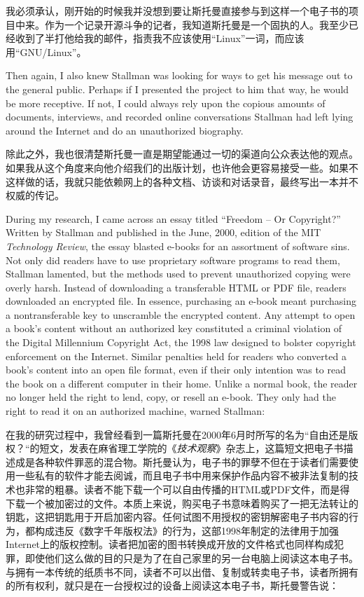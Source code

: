 \ifdefined\chs
我必须承认，刚开始的时候我并没想到要让斯托曼直接参与到这样一个电子书的项目中来。作为一个记录开源斗争的记者，我知道斯托曼是一个固执的人。我至少已经收到了半打他给我的邮件，指责我不应该使用“Linux”一词，而应该用“GNU/Linux”。
\fi

\ifdefined\eng
Then again, I also knew Stallman was looking for ways to get his message out to the general public. Perhaps if I presented the project to him that way, he would be more receptive. If not, I could always rely upon the copious amounts of documents, interviews, and recorded online conversations Stallman had left lying around the Internet and do an unauthorized biography.
\fi

\ifdefined\chs
除此之外，我也很清楚斯托曼一直是期望能通过一切的渠道向公众表达他的观点。如果我从这个角度来向他介绍我们的出版计划，也许他会更容易接受一些。如果不这样做的话，我就只能依赖网上的各种文档、访谈和对话录音，最终写出一本并不权威的传记。
\fi

\ifdefined\eng
During my research, I came across an essay titled ``Freedom -- Or Copyright?'' Written by Stallman and published in the June, 2000, edition of the MIT \textit{Technology Review}, the essay blasted e-books for an assortment of software sins. Not only did readers have to use proprietary software programs to read them, Stallman lamented, but the methods used to prevent unauthorized copying were overly harsh. Instead of downloading a transferable HTML or PDF file, readers downloaded an encrypted file. In essence, purchasing an e-book meant purchasing a nontransferable key to unscramble the encrypted content. Any attempt to open a book's content without an authorized key constituted a criminal violation of the Digital Millennium Copyright Act, the 1998 law designed to bolster copyright enforcement on the Internet. Similar penalties held for readers who converted a book's content into an open file format, even if their only intention was to read the book on a different computer in their home. Unlike a normal book, the reader no longer held the right to lend, copy, or resell an e-book. They only had the right to read it on an authorized machine, warned Stallman:
\fi

\ifdefined\chs
在我的研究过程中，我曾经看到一篇斯托曼在2000年6月时所写的名为“自由还是版权？“的短文，发表在麻省理工学院的《\textit{技术观察}》杂志上，这篇短文把电子书描述成是各种软件罪恶的混合物。斯托曼认为，电子书的罪孽不但在于读者们需要使用一些私有的软件才能去阅诚，而且电子书中用来保护作品内容不被非法复制的技术也非常的粗暴。读者不能下载一个可以自由传播的HTML或PDF文件，而是得下载一个被加密过的文件。本质上来说，购买电子书意味着购买了一把无法转让的钥匙，这把钥匙用于开启加密内容。任何试图不用授权的密钥解密电子书内容的行为，都构成违反《数字千年版权法》的行为，这部1998年制定的法律用于加强Internet上的版权控制。读者把加密的图书转换成开放的文件格式也同样构成犯罪，即使他们这么做的目的只是为了在自己家里的另一台电脑上阅读这本电子书。与拥有一本传统的纸质书不同，读者不可以出借、复制或转卖电子书，读者所拥有的所有权利，就只是在一台授权过的设备上阅读这本电子书，斯托曼警告说：
\fi

